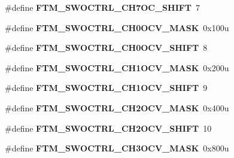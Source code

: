 \begin{DoxyCompactItemize}
\item 
\#define {\bfseries F\+T\+M\+\_\+\+S\+W\+O\+C\+T\+R\+L\+\_\+\+C\+H7\+O\+C\+\_\+\+S\+H\+I\+FT}~7\hypertarget{group__FTM__Register__Masks_gae136ec9e72708b9da0aec24219804269}{}\label{group__FTM__Register__Masks_gae136ec9e72708b9da0aec24219804269}

\item 
\#define {\bfseries F\+T\+M\+\_\+\+S\+W\+O\+C\+T\+R\+L\+\_\+\+C\+H0\+O\+C\+V\+\_\+\+M\+A\+SK}~0x100u\hypertarget{group__FTM__Register__Masks_ga83766e89cee45d6c03318d8031258d17}{}\label{group__FTM__Register__Masks_ga83766e89cee45d6c03318d8031258d17}

\item 
\#define {\bfseries F\+T\+M\+\_\+\+S\+W\+O\+C\+T\+R\+L\+\_\+\+C\+H0\+O\+C\+V\+\_\+\+S\+H\+I\+FT}~8\hypertarget{group__FTM__Register__Masks_gaa2983e96c36fff64f21bf488473f902d}{}\label{group__FTM__Register__Masks_gaa2983e96c36fff64f21bf488473f902d}

\item 
\#define {\bfseries F\+T\+M\+\_\+\+S\+W\+O\+C\+T\+R\+L\+\_\+\+C\+H1\+O\+C\+V\+\_\+\+M\+A\+SK}~0x200u\hypertarget{group__FTM__Register__Masks_gab32bd89d8a7fe488b8bdbbfc753a05aa}{}\label{group__FTM__Register__Masks_gab32bd89d8a7fe488b8bdbbfc753a05aa}

\item 
\#define {\bfseries F\+T\+M\+\_\+\+S\+W\+O\+C\+T\+R\+L\+\_\+\+C\+H1\+O\+C\+V\+\_\+\+S\+H\+I\+FT}~9\hypertarget{group__FTM__Register__Masks_ga277368cadfcfb45d0f011cfa5bba13c5}{}\label{group__FTM__Register__Masks_ga277368cadfcfb45d0f011cfa5bba13c5}

\item 
\#define {\bfseries F\+T\+M\+\_\+\+S\+W\+O\+C\+T\+R\+L\+\_\+\+C\+H2\+O\+C\+V\+\_\+\+M\+A\+SK}~0x400u\hypertarget{group__FTM__Register__Masks_gaa48e37bd5004ccb2bce43692fa0c1a80}{}\label{group__FTM__Register__Masks_gaa48e37bd5004ccb2bce43692fa0c1a80}

\item 
\#define {\bfseries F\+T\+M\+\_\+\+S\+W\+O\+C\+T\+R\+L\+\_\+\+C\+H2\+O\+C\+V\+\_\+\+S\+H\+I\+FT}~10\hypertarget{group__FTM__Register__Masks_ga000183d4ecd255b5497ec73ea76f5cbc}{}\label{group__FTM__Register__Masks_ga000183d4ecd255b5497ec73ea76f5cbc}

\item 
\#define {\bfseries F\+T\+M\+\_\+\+S\+W\+O\+C\+T\+R\+L\+\_\+\+C\+H3\+O\+C\+V\+\_\+\+M\+A\+SK}~0x800u\hypertarget{group__FTM__Register__Masks_gaba02b117cc313564b3f2d67aa238a3ef}{}\label{group__FTM__Register__Masks_gaba02b117cc313564b3f2d67aa238a3ef}


\end{DoxyCompactItemize}
